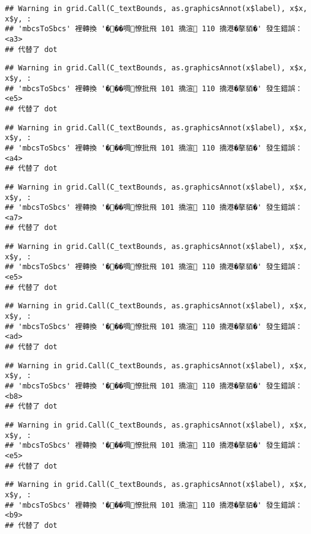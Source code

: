 \documentclass[
]{article}
\begin{document}
\begin{verbatim}
## Warning in grid.Call(C_textBounds, as.graphicsAnnot(x$label), x$x, x$y, :
## 'mbcsToSbcs' 裡轉換 '���啁憭批飛 101 撟渲 110 撟港�摮貊�' 發生錯誤：<a3>
## 代替了 dot
\end{verbatim}

\begin{verbatim}
## Warning in grid.Call(C_textBounds, as.graphicsAnnot(x$label), x$x, x$y, :
## 'mbcsToSbcs' 裡轉換 '���啁憭批飛 101 撟渲 110 撟港�摮貊�' 發生錯誤：<e5>
## 代替了 dot
\end{verbatim}

\begin{verbatim}
## Warning in grid.Call(C_textBounds, as.graphicsAnnot(x$label), x$x, x$y, :
## 'mbcsToSbcs' 裡轉換 '���啁憭批飛 101 撟渲 110 撟港�摮貊�' 發生錯誤：<a4>
## 代替了 dot
\end{verbatim}

\begin{verbatim}
## Warning in grid.Call(C_textBounds, as.graphicsAnnot(x$label), x$x, x$y, :
## 'mbcsToSbcs' 裡轉換 '���啁憭批飛 101 撟渲 110 撟港�摮貊�' 發生錯誤：<a7>
## 代替了 dot
\end{verbatim}

\begin{verbatim}
## Warning in grid.Call(C_textBounds, as.graphicsAnnot(x$label), x$x, x$y, :
## 'mbcsToSbcs' 裡轉換 '���啁憭批飛 101 撟渲 110 撟港�摮貊�' 發生錯誤：<e5>
## 代替了 dot
\end{verbatim}

\begin{verbatim}
## Warning in grid.Call(C_textBounds, as.graphicsAnnot(x$label), x$x, x$y, :
## 'mbcsToSbcs' 裡轉換 '���啁憭批飛 101 撟渲 110 撟港�摮貊�' 發生錯誤：<ad>
## 代替了 dot
\end{verbatim}

\begin{verbatim}
## Warning in grid.Call(C_textBounds, as.graphicsAnnot(x$label), x$x, x$y, :
## 'mbcsToSbcs' 裡轉換 '���啁憭批飛 101 撟渲 110 撟港�摮貊�' 發生錯誤：<b8>
## 代替了 dot
\end{verbatim}

\begin{verbatim}
## Warning in grid.Call(C_textBounds, as.graphicsAnnot(x$label), x$x, x$y, :
## 'mbcsToSbcs' 裡轉換 '���啁憭批飛 101 撟渲 110 撟港�摮貊�' 發生錯誤：<e5>
## 代替了 dot
\end{verbatim}

\begin{verbatim}
## Warning in grid.Call(C_textBounds, as.graphicsAnnot(x$label), x$x, x$y, :
## 'mbcsToSbcs' 裡轉換 '���啁憭批飛 101 撟渲 110 撟港�摮貊�' 發生錯誤：<b9>
## 代替了 dot
\end{verbatim}
\end{document}

